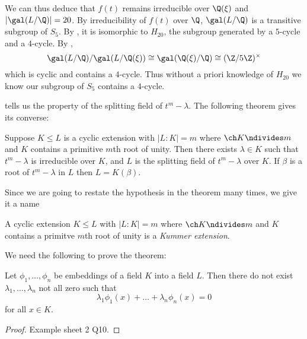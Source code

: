 \documentclass[a4paper]{article}
\begin{document}
\begin{eg}
\begin{enumerate}
   We can thus deduce that \(f(t)\) remains irreducible over \(\Q(\xi)\) and \(|\gal(L/\Q)| = 20\). By irreducibility of \(f(t)\) over \(\Q\), \(\gal(L/\Q)\) is a transitive subgroup of \(S_5\). By , it is isomorphic to \(H_{20}\), the subgroup generated by a \(5\)-cycle and a \(4\)-cycle. By ,
   \[
     \gal(L/\Q)/\gal(L/\Q(\xi)) \cong \gal(\Q(\xi)/\Q) \cong (\Z/5\Z)^\times
   \]
   which is cyclic and contains a \(4\)-cycle. Thus without a priori knowledge of \(H_{20}\) we know our subgroup of \(S_5\) contains a \(4\)-cycle.
 \end{enumerate}
\end{eg}

 tells us the property of the splitting field of \(t^m - \lambda\). The following theorem gives its converse:

\begin{theorem}
  \label{thm:kummer theory}
  Suppose \(K \leq L\) is a cyclic extension with \(|L:K| = m\) where \(\ch K \ndivides m\) and \(K\) contains a primitive \(m\)th root of unity. Then there exists \(\lambda \in K\) such that \(t^m - \lambda\) is irreducible over \(K\), and \(L\) is the splitting field of \(t^m - \lambda\) over \(K\). If \(\beta\) is a root of \(t^m - \lambda\) in \(L\) then \(L = K(\beta)\).
\end{theorem}

Since we are going to restate the hypothesis in the theorem many times, we give it a name

\begin{definition}
  A cyclic extension \(K \leq L\) with \(|L:K| = m\) where \(\ch K \ndivides m\) and \(K\) contains a primitve \(m\)th root of unity is a \emph{Kummer extension}.
\end{definition}

We need the following to prove the theorem:

\begin{lemma}
  \label{lem:linear independence of group characters}
  Let \(\phi_1, \dots, \phi_n\) be embeddings of a field \(K\) into a field \(L\). Then there do not exist \(\lambda_1, \dots, \lambda_n\) not all zero such that
  \[
    \lambda_1 \phi_1(x) + \dots + \lambda_n \phi_n(x) = 0
  \]
  for all \(x \in K\).
\end{lemma}

\begin{proof}
  Example sheet 2 Q10.
\end{proof}
\end{document}

